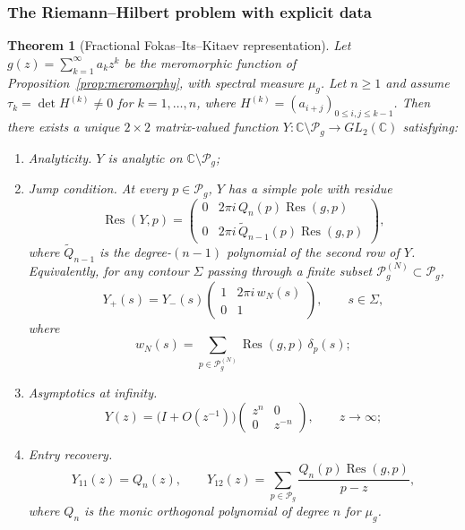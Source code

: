 \documentclass[11pt]{article}
\newtheorem{theorem}{Theorem}[section]
\theoremstyle{definition}
\theoremstyle{remark}
\DeclareMathOperator{\Res}{Res}
\begin{document}
\subsubsection{The Riemann--Hilbert problem with explicit data}
\label{sec:fractional-fik}

\begin{theorem}[Fractional Fokas--Its--Kitaev representation]
\label{thm:fractional-fik}
Let $g(z)=\sum_{k=1}^{\infty}a_{k}z^{k}$ be the meromorphic function of Proposition~\ref{prop:meromorphy}, with spectral measure $\mu_{g}$. Let $n\ge 1$ and assume $\tau_{k}=\det H^{(k)}\ne 0$ for $k=1,\dots,n$, where $H^{(k)}=(a_{i+j})_{0\le i,j\le k-1}$. Then there exists a unique $2\times 2$ matrix-valued function $Y:\mathbb{C}\setminus\mathcal{P}_{g}\to GL_{2}(\mathbb{C})$ satisfying:
\begin{enumerate}[label=(\roman*)]
\item \emph{Analyticity.} $Y$ is analytic on $\mathbb{C}\setminus\mathcal{P}_{g}$;
\item \emph{Jump condition.} At every $p\in\mathcal{P}_{g}$, $Y$ has a simple pole with residue
\begin{equation}
\Res(Y,p)=
\begin{pmatrix}
0 & 2\pi i\,Q_{n}(p)\Res(g,p)\\
0 & 2\pi i\,\widetilde{Q}_{n-1}(p)\Res(g,p)
\end{pmatrix},
\label{eq:fik-residue}
\end{equation}
where $\widetilde{Q}_{n-1}$ is the degree-$(n-1)$ polynomial of the second row of $Y$. Equivalently, for any contour $\Sigma$ passing through a finite subset $\mathcal{P}_{g}^{(N)}\subset\mathcal{P}_{g}$,
\begin{equation}
Y_{+}(s)=Y_{-}(s)
\begin{pmatrix}
1 & 2\pi i\,w_{N}(s)\\
0 & 1
\end{pmatrix},
\qquad s\in\Sigma,
\label{eq:fik-jump}
\end{equation}
where
\begin{equation}
w_{N}(s)=\sum_{p\in\mathcal{P}_{g}^{(N)}}\Res(g,p)\,\delta_{p}(s);
\label{eq:fik-weight}
\end{equation}
\item \emph{Asymptotics at infinity.}
\begin{equation}
Y(z)=\bigl(I+O(z^{-1})\bigr)
\begin{pmatrix}
z^{n} & 0\\
0 & z^{-n}
\end{pmatrix},
\qquad z\to\infty;
\label{eq:fik-asymptotics}
\end{equation}
\item \emph{Entry recovery.}
\begin{equation}
Y_{11}(z)=Q_{n}(z),
\qquad
Y_{12}(z)=\sum_{p\in\mathcal{P}_{g}}\frac{Q_{n}(p)\Res(g,p)}{p-z},
\label{eq:fik-entries}
\end{equation}
where $Q_{n}$ is the monic orthogonal polynomial of degree $n$ for $\mu_{g}$.
\end{enumerate}
\end{theorem}
\end{document}
